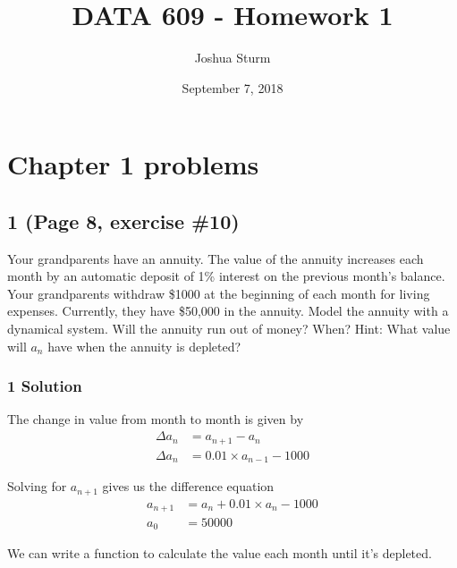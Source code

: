 \documentclass[]{article}
\title{DATA 609 - Homework 1}
\author{Joshua Sturm}
\date{September 7, 2018}
\begin{document}
\maketitle

\hypertarget{chapter-1-problems}{%
\section{Chapter 1 problems}\label{chapter-1-problems}}

\hypertarget{page-8-exercise-10}{%
\subsection{1 (Page 8, exercise \#10)}\label{page-8-exercise-10}}

Your grandparents have an annuity. The value of the annuity increases
each month by an automatic deposit of 1\% interest on the previous
month's balance. Your grandparents withdraw \$1000 at the beginning of
each month for living expenses. Currently, they have \$50,000 in the
annuity. Model the annuity with a dynamical system. Will the annuity run
out of money? When? Hint: What value will \(a_n\) have when the annuity
is depleted?

\hypertarget{solution}{%
\subsubsection{1 Solution}\label{solution}}

\indent The change in value from month to month is given by
\begin{align*}
    \Delta a_n &= a_{n + 1} - a_n \\
    \Delta a_n &= 0.01 \times a_{n - 1} - 1000
\end{align*}

Solving for \(a_{n + 1}\) gives us the difference equation
\begin{align*}
    a_{n + 1} &= a_n + 0.01 \times a_n - 1000 \\
    a_0 &= 50000
\end{align*}

We can write a function to calculate the value each month until it's
depleted.
\end{document}
